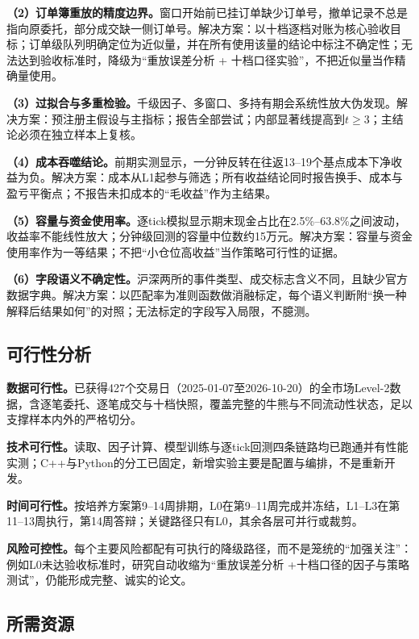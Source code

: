 \documentclass[11pt,a4paper]{article}
\begin{document}
\textbf{（2）订单簿重放的精度边界。}窗口开始前已挂订单缺少订单号，撤单记录不总是指向原委托，部分成交缺一侧订单号。解决方案：以十档逐档对账为核心验收目标；订单级队列明确定位为近似量，并在所有使用该量的结论中标注不确定性；无法达到验收标准时，降级为``重放误差分析 + 十档口径实验''，不把近似量当作精确量使用。

\textbf{（3）过拟合与多重检验。}千级因子、多窗口、多持有期会系统性放大伪发现\citep{mclean2016}。解决方案：预注册主假设与主指标；报告全部尝试；内部显著线提高到$t\ge3$；主结论必须在独立样本上复核。

\textbf{（4）成本吞噬结论。}前期实测显示，一分钟反转在往返13--19个基点成本下净收益为负。解决方案：成本从L1起参与筛选；所有收益结论同时报告换手、成本与盈亏平衡点；不报告未扣成本的``毛收益''作为主结果。

\textbf{（5）容量与资金使用率。}逐tick模拟显示期末现金占比在2.5\%--63.8\%之间波动，收益率不能线性放大；分钟级回测的容量中位数约15万元。解决方案：容量与资金使用率作为一等结果；不把``小仓位高收益''当作策略可行性的证据。

\textbf{（6）字段语义不确定性。}沪深两所的事件类型、成交标志含义不同，且缺少官方数据字典。解决方案：以匹配率为准则函数做消融标定，每个语义判断附``换一种解释后结果如何''的对照；无法标定的字段写入局限，不臆测。

\subsection*{可行性分析}

\textbf{数据可行性。}已获得427个交易日（2025-01-07至2026-10-20）的全市场Level-2数据，含逐笔委托、逐笔成交与十档快照，覆盖完整的牛熊与不同流动性状态，足以支撑样本内外的严格切分。

\textbf{技术可行性。}读取、因子计算、模型训练与逐tick回测四条链路均已跑通并有性能实测；C++与Python的分工已固定，新增实验主要是配置与编排，不是重新开发。

\textbf{时间可行性。}按培养方案第9--14周排期，L0在第9--11周完成并冻结，L1--L3在第11--13周执行，第14周答辩；关键路径只有L0，其余各层可并行或裁剪。

\textbf{风险可控性。}每个主要风险都配有可执行的降级路径，而不是笼统的``加强关注''：例如L0未达验收标准时，研究自动收缩为``重放误差分析 +十档口径的因子与策略测试''，仍能形成完整、诚实的论文。

\subsection*{所需资源}
\end{document}
